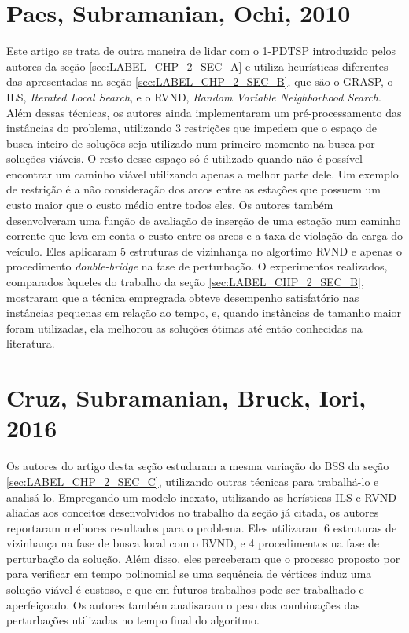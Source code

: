 \section{Paes, Subramanian, Ochi, 2010}\label{sec:LABEL_CHP_2_SEC_D}

Este artigo se trata de outra maneira de lidar com o 1-PDTSP introduzido pelos autores da seção \ref{sec:LABEL_CHP_2_SEC_A} e utiliza heurísticas diferentes das apresentadas na seção \ref{sec:LABEL_CHP_2_SEC_B}, que são o GRASP, o ILS, \textit{Iterated Local Search}, e o RVND, \textit{Random Variable Neighborhood Search}. Além dessas técnicas, os autores ainda implementaram um pré-processamento das instâncias do problema, utilizando 3 restrições que impedem que o espaço de busca inteiro de soluções seja utilizado num primeiro momento na busca por soluções viáveis. O resto desse espaço só é utilizado quando não é possível encontrar um caminho viável utilizando apenas a melhor parte dele. Um exemplo de restrição é a não consideração dos arcos entre as estações que possuem um custo maior que o custo médio entre todos eles. Os autores também desenvolveram uma função de avaliação de inserção de uma estação num caminho corrente que leva em conta o custo entre os arcos e a taxa de violação da carga do veículo. Eles aplicaram 5 estruturas de vizinhança no algortimo RVND e apenas o procedimento \textit{double-bridge} na fase de perturbação. O experimentos realizados, comparados àqueles do trabalho da seção \ref{sec:LABEL_CHP_2_SEC_B}, mostraram que a técnica empregrada obteve desempenho satisfatório nas instâncias pequenas em relação ao tempo, e, quando instâncias de tamanho maior foram utilizadas, ela melhorou as soluções ótimas até então conhecidas na literatura. 

\section{Cruz, Subramanian, Bruck, Iori, 2016}\label{sec:LABEL_CHP_2_SEC_E}

Os autores do artigo desta seção estudaram a mesma variação do BSS da seção \ref{sec:LABEL_CHP_2_SEC_C}, utilizando outras técnicas para trabalhá-lo e analisá-lo. Empregando um modelo inexato, utilizando as herísticas ILS e RVND aliadas aos conceitos desenvolvidos no trabalho da seção já citada, os autores reportaram melhores resultados para o problema. Eles utilizaram 6 estruturas de vizinhança na fase de busca local com o RVND, e 4 procedimentos na fase de perturbação da solução. Além disso, eles perceberam que o processo proposto por \citep{art:REF_ART_2} para verificar em tempo polinomial se uma sequência de vértices induz uma solução viável é custoso, e que em futuros trabalhos pode ser trabalhado e aperfeiçoado. Os autores também analisaram o peso das combinações das perturbações utilizadas no tempo final do algoritmo.

